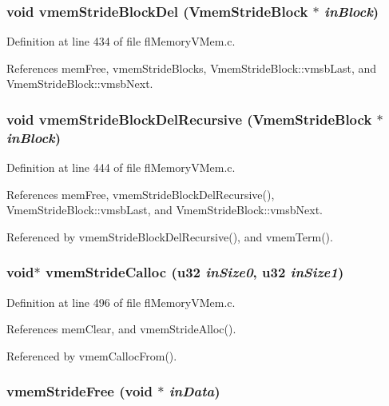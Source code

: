 \subsubsection{\setlength{\rightskip}{0pt plus 5cm}void vmem\-Stride\-Block\-Del ({\bf Vmem\-Stride\-Block} $\ast$ {\em in\-Block})}\label{flMemoryVMem_8c_0733a131032b6396507ab6163e5da8dd}




Definition at line 434 of file fl\-Memory\-VMem.c.

References mem\-Free, vmem\-Stride\-Blocks, Vmem\-Stride\-Block::vmsb\-Last, and Vmem\-Stride\-Block::vmsb\-Next.
\subsubsection{\setlength{\rightskip}{0pt plus 5cm}void vmem\-Stride\-Block\-Del\-Recursive ({\bf Vmem\-Stride\-Block} $\ast$ {\em in\-Block})}\label{flMemoryVMem_8c_ec5ead58cf103c59c742d84eb9266176}




Definition at line 444 of file fl\-Memory\-VMem.c.

References mem\-Free, vmem\-Stride\-Block\-Del\-Recursive(), Vmem\-Stride\-Block::vmsb\-Last, and Vmem\-Stride\-Block::vmsb\-Next.

Referenced by vmem\-Stride\-Block\-Del\-Recursive(), and vmem\-Term().
\subsubsection{\setlength{\rightskip}{0pt plus 5cm}void$\ast$ vmem\-Stride\-Calloc (u32 {\em in\-Size0}, u32 {\em in\-Size1})}\label{flMemoryVMem_8c_29bad506a933463bcced39a356cd71eb}




Definition at line 496 of file fl\-Memory\-VMem.c.

References mem\-Clear, and vmem\-Stride\-Alloc().

Referenced by vmem\-Calloc\-From().
\subsubsection{ vmem\-Stride\-Free (void $\ast$ {\em in\-Data})}\label{flMemoryVMem_8c_a986e759682fc3a182f333d0e3f0f8b6}





